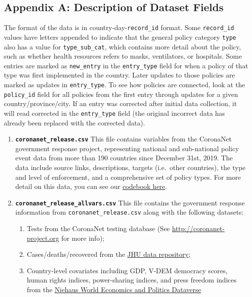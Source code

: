 \documentclass[
]{article}
\providecommand{\tightlist}{%
  \setlength{\itemsep}{0pt}\setlength{\parskip}{0pt}}
\begin{document}
\hypertarget{appendix-a-description-of-dataset-fields}{%
\subsection*{Appendix A: Description of Dataset Fields}\label{appendix-a-description-of-dataset-fields}}

The format of the data is in country-day-\texttt{record\_id} format. Some \texttt{record\_id} values have letters appended to indicate that the general policy category \texttt{type} also has a value for \texttt{type\_sub\_cat}, which contains more detail about the policy, such as whether health resources refers to masks, ventilators, or hospitals. Some entries are marked as \texttt{new\_entry} in the \texttt{entry\_type} field for when a policy of that type was first implemented in the country. Later updates to those policies are marked as updates in \texttt{entry\_type}. To see how policies are connected, look at the \texttt{policy\_id} field for all policies from the first entry through updates for a given country/province/city. If an entry was corrected after initial data collection, it will read corrected in the \texttt{entry\_type} field (the original incorrect data has already been replaced with the corrected data).

\begin{enumerate}
\def\labelenumi{\arabic{enumi}.}
\item
  \textbf{\texttt{coronanet\_release.csv}} This file contains variables from the CoronaNet government response project, representing national and sub-national policy event data from more than 190 countries since December 31st, 2019. The data include source links, descriptions, targets (i.e.~other countries), the type and level of enforcement, and a comprehensive set of policy types. For more detail on this data, you can see our \href{https://docs.google.com/document/d/1zvNMpwj0onFvUZ_gLl4RRjqS-clbHv3TIX6EOHofsME}{codebook here}.
\item
  \textbf{\texttt{coronanet\_release\_allvars.csv}} This file contains the government response information from \texttt{coronanet\_release.csv} along with the following datasets:

  \begin{enumerate}
  \def\labelenumii{\alph{enumii}.}
  \tightlist
  \item
    Tests from the CoronaNet testing database (See \url{http://coronanet-project.org} for more info);
  \item
    Cases/deaths/recovered from the \href{https://github.com/CSSEGISandData/COVID-19}{JHU data repository};
  \item
    Country-level covariates including GDP, V-DEM democracy scores, human rights indices, power-sharing indices, and press freedom indices from the \href{https://niehaus.princeton.edu/news/world-economics-and-politics-dataverse}{Niehaus World Economics and Politics Dataverse}
  \end{enumerate}
\end{enumerate}
\end{document}
